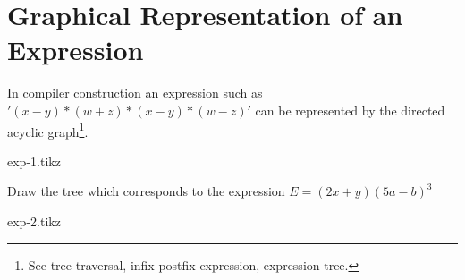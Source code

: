 \documentclass[../main-sheet.tex]{subfiles}
\begin{document}
\section{Graphical Representation of an Expression}
In compiler construction an expression such as $ '(x-y)*(w+z)*(x-y)*(w-z)' $ can be represented by the directed acyclic graph\footnote{See tree traversal, infix postfix expression, expression tree.}.
\begin{center}
    {exp-1.tikz}
\end{center}
\begin{ex}
    Draw the tree which corresponds to the expression $ E=(2x+y)(5a-b)^3 $\\
    \begin{center}
        {exp-2.tikz}
    \end{center}
\end{ex}
\end{document}
